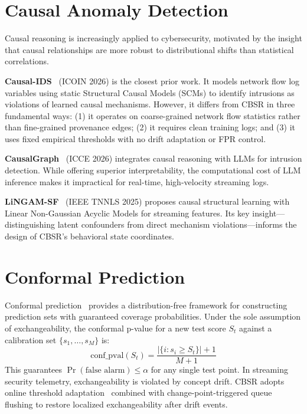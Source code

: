 \section{Causal Anomaly Detection}

Causal reasoning is increasingly applied to cybersecurity, motivated by the insight that causal
relationships are more robust to distributional shifts than statistical correlations.

\textbf{Causal-IDS}~\cite{causalids2026} (ICOIN 2026) is the closest prior work. It models
network flow log variables using static Structural Causal Models (SCMs) to identify intrusions as
violations of learned causal mechanisms. However, it differs from CBSR in three fundamental ways:
(1) it operates on coarse-grained network flow statistics rather than fine-grained provenance
edges; (2) it requires clean training logs; and (3) it uses fixed empirical thresholds with no
drift adaptation or FPR control.

\textbf{CausalGraph}~\cite{causalgraph2026} (ICCE 2026) integrates causal reasoning with LLMs for
intrusion detection. While offering superior interpretability, the computational cost of LLM
inference makes it impractical for real-time, high-velocity streaming logs.

\textbf{LiNGAM-SF}~\cite{lingamsf2025} (IEEE TNNLS 2025) proposes causal structural learning with
Linear Non-Gaussian Acyclic Models for streaming features. Its key insight---distinguishing latent
confounders from direct mechanism violations---informs the design of CBSR's behavioral state
coordinates.


\section{Conformal Prediction}

Conformal prediction~\cite{shafer2008, vovk2005algorithmic} provides a distribution-free
framework for constructing prediction sets with guaranteed coverage probabilities. Under the sole
assumption of exchangeability, the conformal p-value for a new test score $S_t$ against a
calibration set $\{s_1, \ldots, s_M\}$ is:
\begin{equation}
\text{conf\_pval}(S_t) = \frac{|\{i : s_i \geq S_t\}| + 1}{M + 1}
\end{equation}
This guarantees $\Pr(\text{false alarm}) \leq \alpha$ for any single test point. In streaming
security telemetry, exchangeability is violated by concept drift. CBSR adopts online threshold
adaptation~\cite{barber2023conformal, angelopoulos2021gentle} combined with change-point-triggered
queue flushing to restore localized exchangeability after drift events.



